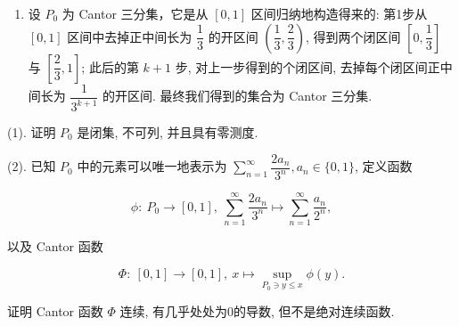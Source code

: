 \documentclass[
]{article}
\providecommand{\tightlist}{%
  \setlength{\itemsep}{0pt}\setlength{\parskip}{0pt}}
\begin{document}
\begin{enumerate}
\def\labelenumi{\arabic{enumi}.}
\setcounter{enumi}{1}
\tightlist
\item
  设 \(P_0\) 为 Cantor 三分集，它是从 \([0, 1]\) 区间归纳地构造得来的:
  第1步从 \([0, 1]\) 区间中去掉正中间长为 \(\dfrac{1}{3}\) 的开区间
  \(\left( \dfrac{1}{3}, \dfrac{2}{3} \right)\), 得到两个闭区间
  \(\left[ 0, \dfrac{1}{3} \right]\) 与
  \(\left[ \dfrac{2}{3}, 1 \right]\); 此后的第 \(k + 1\) 步,
  对上一步得到的个闭区间, 去掉每个闭区间正中间长为
  \(\dfrac{1}{3^{k+1}}\) 的开区间. 最终我们得到的集合为 Cantor 三分集.
\end{enumerate}

(1). 证明 \(P_0\) 是闭集, 不可列, 并且具有零测度.

(2). 已知 \(P_0\) 中的元素可以唯一地表示为
\(\displaystyle \sum\limits_{n=1}^{\infty} \dfrac{2a_n}{3^n}, a_n \in \{0, 1\}\),
定义函数

\[\phi: ~ P_0 \rightarrow [0, 1], ~ \sum\limits_{n=1}^{\infty} \dfrac{2a_n}{3^n} \mapsto \sum\limits_{n=1}^{\infty} \dfrac{a_n}{2^n},\]

以及 Cantor 函数

\[\Phi: ~ [0, 1] \rightarrow [0, 1], ~ x \mapsto \sup\limits_{P_0 \ni y \leqslant x} \phi(y).\]

证明 Cantor 函数 \(\Phi\) 连续, 有几乎处处为0的导数, 但不是绝对连续函数.
\end{document}
